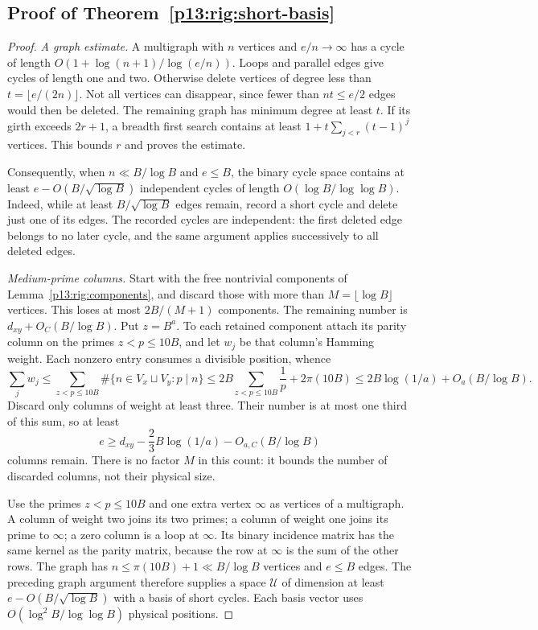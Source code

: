 \subsection{Proof of Theorem~\ref{p13:rig:short-basis}}
\label{p14:comp:rigidity:short-basis}

\begin{proof}
\emph{A graph estimate.}
A multigraph with $n$ vertices and $e/n\to\infty$ has a cycle
of length $O(1+\log(n+1)/\log(e/n))$.  Loops and parallel
edges give cycles of length one and two.  Otherwise delete
vertices of degree less than $t=\lfloor e/(2n)\rfloor$.
Not all vertices can disappear, since fewer than $nt\le e/2$
edges would then be deleted.  The remaining graph has minimum
degree at least $t$.  If its girth exceeds $2r+1$, a breadth
first search contains at least
$1+t\sum_{j<r}(t-1)^j$ vertices.  This bounds $r$ and proves
the estimate.

Consequently, when $n\ll B/\log B$ and $e\le B$, the binary
cycle space contains at least $e-O(B/\sqrt{\log B})$
independent cycles of length $O(\log B/\log\log B)$.
Indeed, while at least $B/\sqrt{\log B}$ edges remain,
record a short cycle and delete just one of its edges.
The recorded cycles are independent: the first deleted edge
belongs to no later cycle, and the same argument applies
successively to all deleted edges.

\emph{Medium-prime columns.}
Start with the free nontrivial components of
Lemma~\ref{p13:rig:components}, and discard those with more
than $M=\lfloor\log B\rfloor$ vertices.  This loses at most
$2B/(M+1)$ components.  The remaining number is
$d_{xy}+O_C(B/\log B)$.  Put $z=B^a$.  To each retained
component attach its parity column on the primes $z<p\le10B$,
and let $w_j$ be that column's Hamming weight.  Each nonzero
entry consumes a divisible position, whence
\[
 \sum_j w_j
 \le\sum_{z<p\le10B}\#\{n\in V_x\sqcup V_y:p\mid n\}
 \le2B\sum_{z<p\le10B}\frac1p+2\pi(10B)
 \le2B\log(1/a)+O_a(B/\log B).
\]
Discard only columns of weight at least three.  Their number
is at most one third of this sum, so at least
\[
                 e\ge d_{xy}-\frac23B\log(1/a)
                                   -O_{a,C}(B/\log B)
\]
columns remain.  There is no factor $M$ in this count: it
bounds the number of discarded columns, not their physical size.

Use the primes $z<p\le10B$ and one extra vertex $\infty$
as vertices of a multigraph.  A column of weight two joins its
two primes; a column of weight one joins its prime to $\infty$;
a zero column is a loop at $\infty$.  Its binary incidence
matrix has the same kernel as the parity matrix, because the
row at $\infty$ is the sum of the other rows.  The graph has
$n\le\pi(10B)+1\ll B/\log B$ vertices and $e\le B$ edges.
The preceding graph argument therefore supplies a space
$\mathcal U$ of dimension at least
$e-O(B/\sqrt{\log B})$ with a basis of short cycles.
Each basis vector uses
$O(\log^2 B/\log\log B)$ physical positions.


\end{proof}
